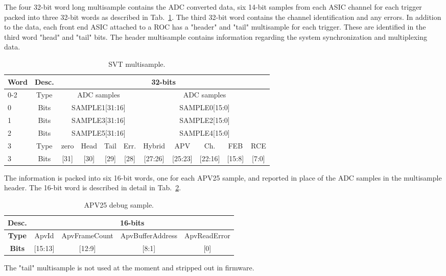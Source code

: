 \documentclass{desyproc}
\begin{document}
The four 32-bit word long multisample contains the ADC converted data, six 14-bit samples from each ASIC channel for each trigger 
packed into three 32-bit words as described in Tab.~\ref{tab:ms}. The third 32-bit word contains the channel identification and any errors. 
In addition to the data, each front end ASIC attached to a ROC has a "header" and "tail" multisample for each trigger. These are identified 
in the third word "head" and "tail" bits. The header multisample contains information regarding the system synchronization and multiplexing data. 
\begin{table}[]
  \begin{center}
    \caption{SVT multisample.}
    \label{tab:ms}
    \begin{tabular}{|l|c|c|c|c|c|c|c|c|c|c|}
   	\hline
    	\bf Word & \bf Desc. & \multicolumn{9}{|c|}{\bf 32-bits}\\
      	\hline
    	 0-2 &  Type &  \multicolumn{4}{|c|}{ADC samples} &   \multicolumn{5}{|c|}{ADC samples}\\
      	\hline
    	 0 &  Bits &  \multicolumn{4}{|c|}{SAMPLE1[31:16]} &   \multicolumn{5}{|c|}{SAMPLE0[15:0]}\\
      	\hline
    	 1 &  Bits &  \multicolumn{4}{|c|}{SAMPLE3[31:16]} &   \multicolumn{5}{|c|}{SAMPLE2[15:0]}\\
      	\hline
    	 2 &  Bits &  \multicolumn{4}{|c|}{SAMPLE5[31:16]} &   \multicolumn{5}{|c|}{SAMPLE4[15:0]}\\
      	\hline
    	 3 &  Type & zero & Head & Tail & Err. & Hybrid & APV & Ch. & FEB & RCE \\
      	\hline
    	 3 &  Bits & [31] & [30] & [29] & [28] & [27:26] & [25:23] & [22:16] & [15:8] & [7:0] \\
	\hline
      \end{tabular}
  \end{center}
\end{table}
The information is packed into six 16-bit words, one for each APV25 sample, and reported in place of the ADC samples in the multisample header. 
The 16-bit word is described in detail in Tab.~\ref{tab:header}. 
\begin{table}[]
  \begin{center}
    \caption{APV25 debug sample.}
    \label{tab:header}
    \begin{tabular}{|c|c|c|c|c|}
   	\hline
    	\bf Desc. & \multicolumn{4}{|c|}{\bf 16-bits}\\
      	\hline
    	 \bf Type &  ApvId &   ApvFrameCount &  ApvBufferAddress &  ApvReadError \\
      	\hline
    	 \bf Bits & [15:13] &   [12:9] & [8:1] & [0] \\
	\hline
      \end{tabular}
  \end{center}
\end{table}
The "tail" multisample is not used at the moment and stripped out in firmware.
\end{document}

